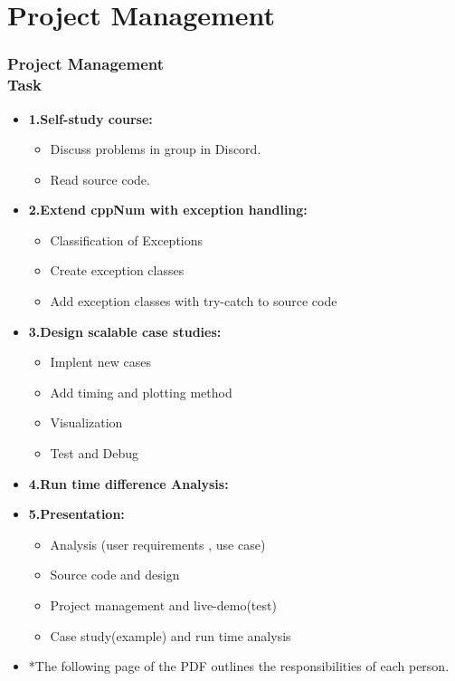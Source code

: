 \documentclass[ucs,10pt]{beamer}
\begin{document}
\section{Project Management}
\begin{frame}
\frametitle{Project Management \\
	\small \color{rwth-blue} Task}
	\begin{itemize}	
			\item \textbf{1.Self-study course:}
				\begin{itemize}
					\item Discuss problems in group in Discord.
					\item Read source code.
				\end{itemize}
			\item \textbf{2.Extend cppNum with exception handling:}
				\begin{itemize}
					\item Classification of Exceptions
					\item Create exception classes
					\item Add exception classes with try-catch to source code
				\end{itemize}
			\item \textbf{3.Design scalable case studies:}
				\begin{itemize}
				\item Implent new cases
				\item Add timing and plotting method
				\item Visualization
				\item Test and Debug
				\end{itemize}
			\item \textbf{4.Run time difference Analysis:}
			\item \textbf{5.Presentation:}
				\begin{itemize}
				\item Analysis (user requirements , use case)
				\item Source code and design
				\item Project management and live-demo(test)
				\item Case study(example) and run time analysis
				\end{itemize}
			\item *The following page of the PDF outlines the responsibilities of each person.
	\end{itemize}
\end{frame}
	
\end{document}
